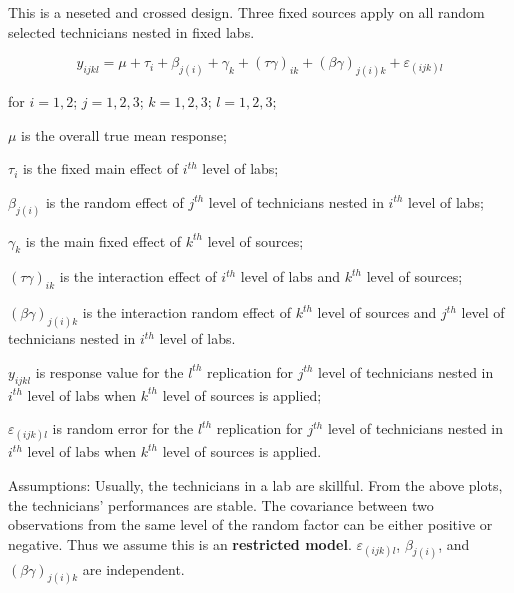 \documentclass[12pt,]{article}
\begin{document}
This is a neseted and crossed design. Three fixed sources apply on all
random selected technicians nested in fixed labs.

\[y_{ijkl}=\mu+\tau_i+\beta_{j(i)}+\gamma_{k}+(\tau\gamma)_{ik}+(\beta\gamma)_{j(i)k}+\varepsilon_{(ijk)l}\]

for \(i=1,2\); \(j=1,2,3\); \(k=1,2,3\); \(l=1,2,3\);

\(\mu\) is the overall true mean response;

\(\tau_i\) is the fixed main effect of \(i^{th}\) level of labs;

\(\beta_{j(i)}\) is the random effect of \(j^{th}\) level of technicians
nested in \(i^{th}\) level of labs;

\(\gamma_{k}\) is the main fixed effect of \(k^{th}\) level of sources;

\((\tau\gamma)_{ik}\) is the interaction effect of \(i^{th}\) level of
labs and \(k^{th}\) level of sources;

\((\beta\gamma)_{j(i)k}\) is the interaction random effect of \(k^{th}\)
level of sources and \(j^{th}\) level of technicians nested in
\(i^{th}\) level of labs.

\(y_{ijkl}\) is response value for the \(l^{th}\) replication for
\(j^{th}\) level of technicians nested in \(i^{th}\) level of labs when
\(k^{th}\) level of sources is applied;

\(\varepsilon_{(ijk)l}\) is random error for the \(l^{th}\) replication
for \(j^{th}\) level of technicians nested in \(i^{th}\) level of labs
when \(k^{th}\) level of sources is applied.

Assumptions: Usually, the technicians in a lab are skillful. From the
above plots, the technicians' performances are stable. The covariance
between two observations from the same level of the random factor can be
either positive or negative. Thus we assume this is an
\textbf{restricted model}. \(\varepsilon_{(ijk)l}\), \(\beta_{j(i)}\),
and \((\beta\gamma)_{j(i)k}\) are independent.
\end{document}
